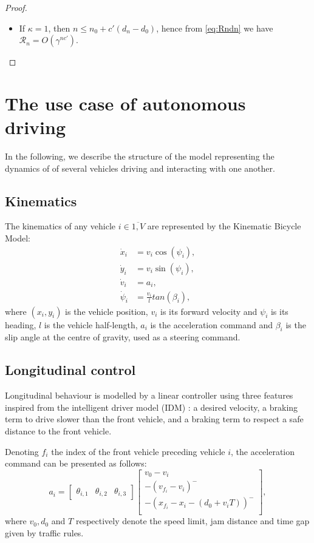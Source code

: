 \documentclass{article}
\begin{document}
\begin{proof}
\begin{itemize}
		\item If $\kappa = 1$, then $n \leq n_0 + c'(d_n-d_0)$, hence from \eqref{eq:Rndn} we have $\mathcal{R}_n = O\left(\gamma^{nc'}\right)$.
	\end{itemize}
\end{proof}


\section{The use case of autonomous driving}

In the following, we describe the structure of the model representing the dynamics of of several vehicles driving and interacting with one another.

\subsection{Kinematics}

The kinematics of any vehicle $i\in\overline{1,V}$ are represented by the Kinematic Bicycle Model:
\begin{align}
	\dot{x}_i &= v_i\cos(\psi_i), \nonumber\\
	\dot{y}_i &= v_i\sin(\psi_i), \nonumber\\
	\dot{v}_i &= a_i, \nonumber\\
	\dot{\psi}_i &= \frac{v_i}{l}tan(\beta_i), \nonumber
\end{align}
where $(x_i, y_i)$ is the vehicle position, $v_i$ is its forward velocity and $\psi_i$ is its heading, $l$ is the vehicle half-length, $a_i$ is the acceleration command and $\beta_i$ is the slip angle at the centre of gravity, used as a steering command.

\subsection{Longitudinal control}
Longitudinal behaviour is modelled by a linear controller using three features inspired from the intelligent driver model (IDM) \cite{Treiber2000}: a desired velocity, a braking term to drive slower than the front vehicle, and a braking term to respect a safe distance to the front vehicle.

Denoting $f_i$ the index of the front vehicle preceding vehicle $i$, the acceleration command can be presented as follows:
\begin{equation*}
	a_i = \begin{bmatrix}
	\theta_{i,1} & \theta_{i,2} & \theta_{i,3}
	\end{bmatrix} \begin{bmatrix}
		v_0 - v_i \\
		-(v_{f_i}-v_i)^- \\
		-(x_{f_i} - x_i - (d_0 + v_iT))^- \\
	\end{bmatrix},
	\label{eq:theta_a}
\end{equation*}
where $v_0, d_0$ and $T$ respectively denote the speed limit, jam distance and time gap given by traffic rules.
\end{document}
